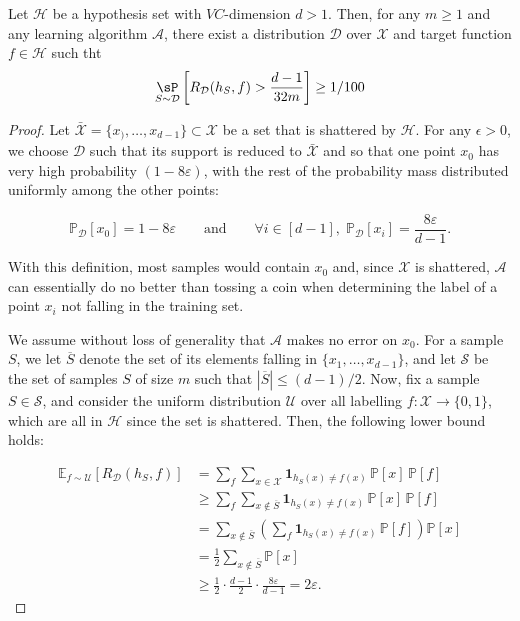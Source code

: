 \begin{theorem}
    Let $\mathcal{H}$ be a hypothesis set with $VC$-dimension $d>1$. Then, for any $m\geq 1$ and any learning algorithm $\mathcal{A}$, there exist a distribution $\mathcal{D}$ over $\mathcal{X}$ and target function $f\in\mathcal{H}$ such tht 
    \begin{equation}
        \underset{S\sim\mathcal{D}}{\sP} \left[R_{\mathcal{D}}(h_{S},f)>\frac{d-1}{32m}\right]\geq 1/100
    \end{equation}
\end{theorem}

\begin{proof}
Let $\bar{\mathcal{X}}=\{x_),\dots,x_{d-1}\}\subset\mathcal{X}$ be a set that is shattered by $\mathcal{H}$. For any $\epsilon>0$, we choose $\mathcal{D}$ such that its support is reduced to $\bar{\mathcal{X}}$ and so that one point $x_{0}$ has very high probability $\left(1-8\varepsilon\right)$, with the rest of the probability mass distributed uniformly among the other points:

\begin{equation}\label{eq:3.32}
\mathbb{P}_{\mathcal{D}}[x_0]=1-8\varepsilon\qquad\text{and}\qquad
\forall i\in[d-1],\;\mathbb{P}_{\mathcal{D}}[x_i]=\frac{8\varepsilon}{d-1}.
\end{equation}

With this definition, most samples would contain $x_0$ and, since $\mathcal{X}$ is shattered, $\mathcal{A}$ can essentially do no better than tossing a coin when determining the label of a point $x_i$ not falling in the training set.

We assume without loss of generality that $\mathcal{A}$ makes no error on $x_0$. For a sample $S$, we let $\overline S$ denote the set of its elements falling in $\{x_1,\dots,x_{d-1}\}$, and let $\mathcal S$ be the set of samples $S$ of size $m$ such that $|\overline S|\le (d-1)/2$. Now, fix a sample $S\in\mathcal S$, and consider the uniform distribution $\mathcal U$ over all labelling $f:\mathcal{X}\to\{0,1\}$, which are all in $\mathcal H$ since the set is shattered. Then, the following lower bound holds:

\begin{align}
\mathbb{E}_{f\sim\mathcal U}\left[ R_{\mathcal D}(h_S,f)\right]
&= \sum_{f}\sum_{x\in\mathcal{X}}\mathbf{1}_{h_S(x)\neq f(x)}\,\mathbb{P}[x]\,\mathbb{P}[f] \nonumber\\
&\ge \sum_{f}\sum_{x\notin\overline S}\mathbf{1}_{h_S(x)\neq f(x)}\,\mathbb{P}[x]\,\mathbb{P}[f] \nonumber\\
&= \sum_{x\notin\overline S}\left(\sum_{f}\mathbf{1}_{h_S(x)\neq f(x)}\,\mathbb{P}[f]\right)\mathbb{P}[x] \nonumber\\
&= \tfrac{1}{2}\sum_{x\notin\overline S}\mathbb{P}[x] \nonumber\\
&\ge \tfrac{1}{2}\cdot\frac{d-1}{2}\cdot\frac{8\varepsilon}{d-1} = 2\varepsilon.
\label{eq:3.33}
\end{align}


\end{proof}
